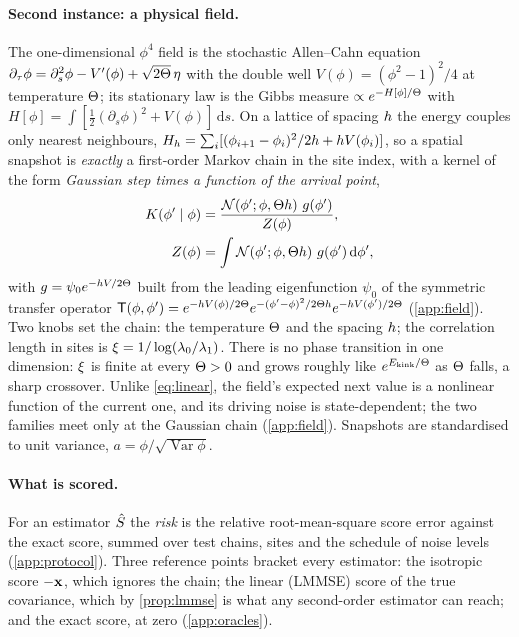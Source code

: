 \paragraph{Second instance: a physical field.}
The one-dimensional $\phi^4$ field is the stochastic Allen--Cahn equation
$\partial_\tau\phi=\partial_s^2\phi-V'(\phi)+\sqrt{2\Theta}\,\eta$ with the double well
$V(\phi)=(\phi^2-1)^2/4$ at temperature $\Theta$; its stationary law is the Gibbs measure
$\propto e^{-H[\phi]/\Theta}$ with $H[\phi]=\int[\tfrac12(\partial_s\phi)^2+V(\phi)]\,\mathrm{d}s$.
On a lattice of spacing $h$ the energy couples only nearest neighbours,
$H_{h}=\sum_i[(\phi_{i+1}-\phi_i)^2/2h+h V(\phi_i)]$, so a spatial snapshot is
\emph{exactly} a first-order Markov chain in the site index, with a kernel of the form
\emph{Gaussian step times a function of the arrival point},
\begin{equation}
  \begin{aligned}
  K(\phi'\mid\phi)&=\frac{\mathcal{N}\!\left(\phi';\phi,\Theta h\right)\,g(\phi')}{Z(\phi)},\\
  Z(\phi)&=\int\mathcal{N}\!\left(\phi';\phi,\Theta h\right)\,g(\phi')\,\mathrm{d}\phi',
  \end{aligned}
  \label{eq:tilted}
\end{equation}
with $g=\psi_0e^{-h V/2\Theta}$ built from the leading eigenfunction $\psi_0$ of the symmetric
transfer operator $\mathsf{T}(\phi,\phi')=e^{-h V(\phi)/2\Theta}e^{-(\phi'-\phi)^2/2\Theta h}e^{-h V(\phi')/2\Theta}$
(\cref{app:field}). Two knobs set the chain: the temperature $\Theta$ and the spacing $h$;
the correlation length in sites is $\xi=1/\log(\lambda_0/\lambda_1)$. There is no phase
transition in one dimension: $\xi$ is finite at every $\Theta>0$ and grows roughly like
$e^{E_{\mathrm{kink}}/\Theta}$ as $\Theta$ falls, a sharp crossover. Unlike
\cref{eq:linear}, the field's expected next value is a nonlinear function of the current one,
and its driving noise is state-dependent; the two families meet only at the Gaussian chain
(\cref{app:field}). Snapshots are standardised to unit variance, $a=\phi/\sqrt{\operatorname{Var}\phi}$.

\paragraph{What is scored.}
For an estimator $\hat{S}$ the \emph{risk} is the relative root-mean-square score error
against the exact score, summed over test chains, sites and the schedule of noise levels
(\cref{app:protocol}). Three reference points bracket every estimator: the isotropic score
$-\mathbf{x}$, which ignores the chain; the linear (LMMSE) score of the true covariance, which by
\cref{prop:lmmse} is what any second-order estimator can reach; and the exact score, at zero
(\cref{app:oracles}).
